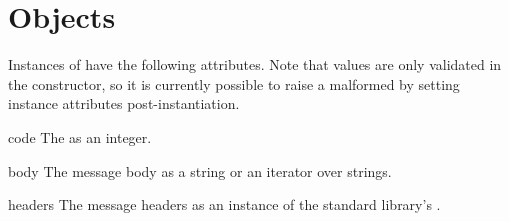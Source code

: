\section{ Objects \label{response}}

Instances of  have the following attributes. Note that
values are only validated in the constructor, so it is currently possible to
raise a malformed  by setting instance attributes
post-instantiation.

\begin{datadesc}{code}
The  as an integer.
\end{datadesc}

\begin{datadesc}{body}
The message body as a string or an iterator over strings.
\end{datadesc}

\begin{datadesc}{headers}
The message headers as an instance of the standard library's
.
\end{datadesc}
